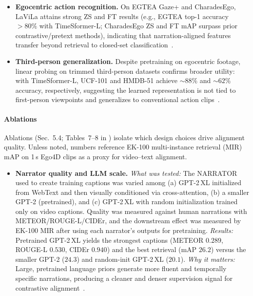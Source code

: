 \begin{enrichment}
\begin{enrichment}
\begin{itemize}
            \item \textbf{Egocentric action recognition.} On EGTEA Gaze\mbox{+} and CharadesEgo, LaViLa attains strong ZS and FT results (e.g., EGTEA top\mbox{-}1 accuracy $>{}80\%$ with TimeSformer\mbox{-}L; CharadesEgo ZS and FT mAP surpass prior contrastive/pretext methods), indicating that narration\mbox{-}aligned features transfer beyond retrieval to closed\mbox{-}set classification~\cite{zhao2022_lavila}.
            \item \textbf{Third\mbox{-}person generalization.} Despite pretraining on egocentric footage, linear probing on trimmed third\mbox{-}person datasets confirms broader utility: with TimeSformer\mbox{-}L, UCF\mbox{-}101 and HMDB\mbox{-}51 achieve $\sim 88\%$ and $\sim 62\%$ accuracy, respectively, suggesting the learned representation is not tied to first\mbox{-}person viewpoints and generalizes to conventional action clips~\cite{zhao2022_lavila}.
        \end{itemize}
        
        \newpage
        
        \paragraph{Ablations}
        Ablations (Sec.~5.4; Tables~7--8 in \cite{zhao2022_lavila}) isolate which design choices drive alignment quality. Unless noted, numbers reference EK\mbox{-}100 multi\mbox{-}instance retrieval (MIR) mAP on 1\,s Ego4D clips as a proxy for video--text alignment.
        \begin{itemize}
            \item \textbf{Narrator quality and LLM scale.} \emph{What was tested:} The NARRATOR used to create training captions was varied among (a) GPT\mbox{-}2\,XL initialized from WebText and then visually conditioned via cross\mbox{-}attention, (b) a smaller GPT\mbox{-}2 (pretrained), and (c) GPT\mbox{-}2\,XL with random initialization trained only on video captions. Quality was measured against human narrations with METEOR/ROUGE\mbox{-}L/CIDEr, and the downstream effect was measured by EK\mbox{-}100 MIR after using each narrator’s outputs for pretraining. \emph{Results:} Pretrained GPT\mbox{-}2\,XL yields the strongest captions (METEOR $0.289$, ROUGE\mbox{-}L $0.530$, CIDEr $0.940$) and the best retrieval (mAP $26.2$) versus the smaller GPT\mbox{-}2 ($24.3$) and random\mbox{-}init GPT\mbox{-}2\,XL ($20.1$). \emph{Why it matters:} Large, pretrained language priors generate more fluent and temporally specific narrations, producing a cleaner and denser supervision signal for contrastive alignment~\cite{zhao2022_lavila}.
            

\end{itemize}
\end{enrichment}
\end{enrichment}

